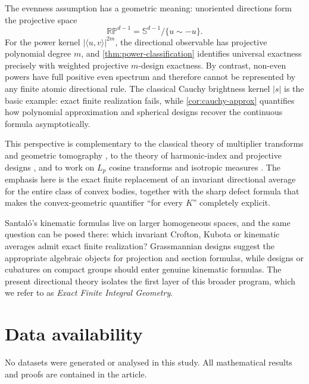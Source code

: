 \documentclass[12pt,a4paper]{article}
\newcommand{\Sph}{\mathbb S}
\newcommand{\RP}{\mathbb{RP}}
\theoremstyle{plain}
\theoremstyle{definition}
\begin{document}
The evenness assumption has a geometric meaning: unoriented directions form the projective space
\[
 \RP^{d-1}=\Sph^{d-1}/\{u\sim-u\}.
\]
For the power kernel $|\langle u,v\rangle|^{2m}$, the directional observable has projective polynomial degree $m$, and \cref{thm:power-classification} identifies universal exactness precisely with weighted projective $m$-design exactness. By contrast, non-even powers have full positive even spectrum and therefore cannot be represented by any finite atomic directional rule. The classical Cauchy brightness kernel $|s|$ is the basic example: exact finite realization fails, while \cref{cor:cauchy-approx} quantifies how polynomial approximation and spherical designs recover the continuous formula asymptotically.

This perspective is complementary to the classical theory of multiplier transforms and geometric tomography \cite{Gardner,Kiderlen,GYY}, to the theory of harmonic-index and projective designs \cite{BOT,ZhuEtAl,Lyubich2009,Lindblad}, and to work on $L_p$ cosine transforms and isotropic measures \cite{LiXiZhang}. The emphasis here is the exact finite replacement of an invariant directional average for the entire class of convex bodies, together with the sharp defect formula that makes the convex-geometric quantifier ``for every $K$'' completely explicit.

Santal\'o's kinematic formulas live on larger homogeneous spaces, and the same question can be posed there: which invariant Crofton, Kubota or kinematic averages admit exact finite realization? Grassmannian designs suggest the appropriate algebraic objects for projection and section formulas, while designs or cubatures on compact groups should enter genuine kinematic formulas. The present directional theory isolates the first layer of this broader program, which we refer to as \emph{Exact Finite Integral Geometry}.

\section*{Data availability}
No datasets were generated or analysed in this study. All mathematical results and proofs are contained in the article.
\end{document}
